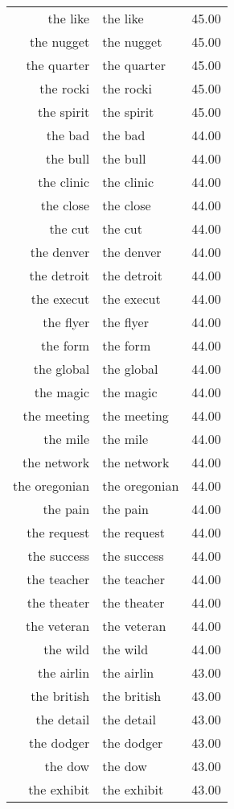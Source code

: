 \begin{table}[ht]
\begin{tabular}{rlr}
  the like & the like & 45.00 \\ 
  the nugget & the nugget & 45.00 \\ 
  the quarter & the quarter & 45.00 \\ 
  the rocki & the rocki & 45.00 \\ 
  the spirit & the spirit & 45.00 \\ 
  the bad & the bad & 44.00 \\ 
  the bull & the bull & 44.00 \\ 
  the clinic & the clinic & 44.00 \\ 
  the close & the close & 44.00 \\ 
  the cut & the cut & 44.00 \\ 
  the denver & the denver & 44.00 \\ 
  the detroit & the detroit & 44.00 \\ 
  the execut & the execut & 44.00 \\ 
  the flyer & the flyer & 44.00 \\ 
  the form & the form & 44.00 \\ 
  the global & the global & 44.00 \\ 
  the magic & the magic & 44.00 \\ 
  the meeting & the meeting & 44.00 \\ 
  the mile & the mile & 44.00 \\ 
  the network & the network & 44.00 \\ 
  the oregonian & the oregonian & 44.00 \\ 
  the pain & the pain & 44.00 \\ 
  the request & the request & 44.00 \\ 
  the success & the success & 44.00 \\ 
  the teacher & the teacher & 44.00 \\ 
  the theater & the theater & 44.00 \\ 
  the veteran & the veteran & 44.00 \\ 
  the wild & the wild & 44.00 \\ 
  the airlin & the airlin & 43.00 \\ 
  the british & the british & 43.00 \\ 
  the detail & the detail & 43.00 \\ 
  the dodger & the dodger & 43.00 \\ 
  the dow & the dow & 43.00 \\ 
  the exhibit & the exhibit & 43.00 \\ 

\end{tabular}
\end{table}
